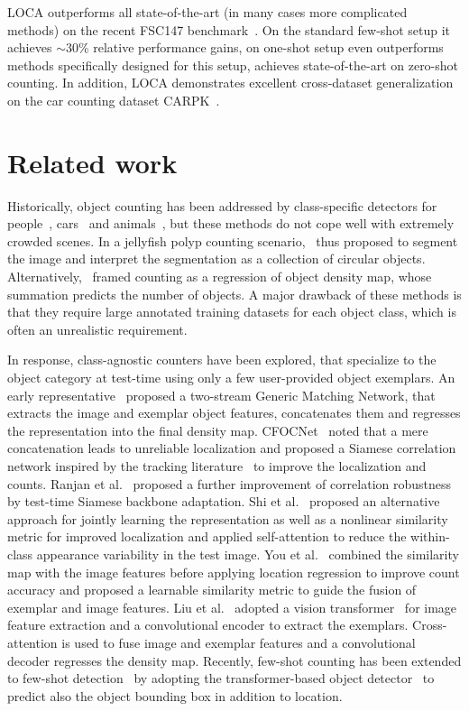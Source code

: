 \documentclass[10pt,twocolumn,letterpaper]{article}
\begin{document}
LOCA outperforms all state-of-the-art (in many cases more complicated methods) on the recent FSC147 benchmark~\cite{famnet}. 
On the standard few-shot setup it achieves $\sim$30\% relative performance gains, on one-shot setup even outperforms methods specifically designed for this setup, achieves state-of-the-art on zero-shot counting.
In addition, LOCA demonstrates excellent cross-dataset generalization on the car counting dataset CARPK~\cite{carpk}.


\section{Related work}

Historically, object counting has been addressed by class-specific detectors for people~\cite{crowdcounting, crowdcounting2}, cars~\cite{cars, carpk} and animals~\cite{animals}, but these methods do not cope well with extremely crowded scenes. In a jellyfish polyp counting scenario,~\cite{polyps} thus proposed to segment the image and interpret the segmentation as a collection of circular objects.
Alternatively,~\cite{crowdcounting, regression1} framed counting as a regression of object density map, whose summation predicts the number of objects. 
A major drawback of these methods is that they require large annotated training datasets for each object class, which is often an unrealistic requirement.

In response, class-agnostic counters have been explored, that specialize to the object category at test-time using only a few user-provided object exemplars.
An early representative~\cite{gmn} proposed a two-stream Generic Matching Network, that extracts the image and exemplar object features, concatenates them and regresses the representation into the final density map. 
CFOCNet~\cite{cfocnet} noted that a mere concatenation leads to unreliable localization and proposed a Siamese correlation network inspired by the tracking literature~\cite{siamfc} to improve the localization and counts.
Ranjan et al.~\cite{famnet} proposed a further improvement of correlation robustness by test-time Siamese backbone adaptation.
Shi et al.~\cite{bmnet} proposed an alternative approach for jointly learning the representation as well as a nonlinear similarity metric for improved localization and applied self-attention to reduce the within-class appearance variability in the test image.
You et al.~\cite{safecount} combined the similarity map with the image features before applying location regression to improve count accuracy and proposed a learnable similarity metric to guide the fusion of exemplar and image features.
Liu et al.~\cite{countr} adopted a vision transformer~\cite{vit} for image feature extraction and a convolutional encoder to extract the exemplars. Cross-attention is  used to fuse image and exemplar features and a convolutional decoder regresses the density map.
Recently, few-shot counting has been extended to few-shot detection~\cite{countingdetr} by adopting the transformer-based object detector~\cite{anchor_detr} to predict also the object bounding box in addition to location.
\end{document}
